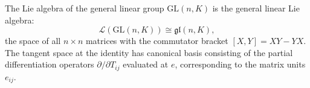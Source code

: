 The Lie algebra of the general linear group $\mathrm{GL}(n, K)$ is the general linear Lie algebra:
$$\mathcal{L}(\mathrm{GL}(n, K)) \cong \mathfrak{gl}(n, K),$$
the space of all $n \times n$ matrices with the commutator bracket $[X, Y] = XY - YX$. The tangent space at the identity has canonical basis consisting of the partial differentiation operators $\partial/\partial T_{ij}$ evaluated at $e$, corresponding to the matrix units $e_{ij}$.
